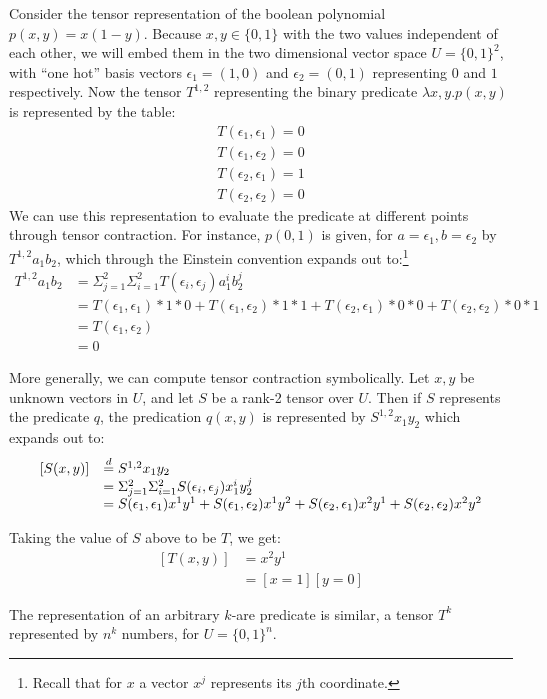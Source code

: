 \documentclass{article} %
\def\withmath#1{\relax\ifmmode#1\else{$ #1 $}\fi}
\def\defeq{\withmath{\stackrel{d}{=}}}
\begin{document}
\begin{example}\label{ex:tc-1}
  Consider the tensor representation of the boolean polynomial \(p(x,y) = x(1-y)\). Because \(x,y\in \{0,1\}\) with the two values independent of each other, we will embed them in the two dimensional vector space \(U=\{0,1\}^2\), with ``one hot'' basis vectors \(\epsilon_1=(1,0)\) and \(\epsilon_2=(0,1)\) representing \(0\) and \(1\) respectively. Now the tensor \(T^{1,2}\) representing the binary predicate \(\lambda x,y. p(x,y)\) is represented by the table:
  \[
  \begin{array}{l}
    T(\epsilon_1,\epsilon_1)=0\\
    T(\epsilon_1,\epsilon_2)=0\\
    T(\epsilon_2,\epsilon_1)=1\\
    T(\epsilon_2,\epsilon_2)=0
  \end{array}
  \]
  We can use this representation to evaluate the predicate at different points through tensor contraction. For instance, \(p(0,1)\) is given, for \(a=\epsilon_1,b=\epsilon_2\) by \(T^{1,2}a_1 b_2\), which through the Einstein convention expands out to:\footnote{Recall that for \(x\) a vector \(x^j\) represents its \(j\)th coordinate.}
  \[\begin{array}{ll}
  T^{1,2}a_1 b_2 &= \Sigma_{j=1}^2 \Sigma_{i=1}^2 T(\epsilon_i,\epsilon_j)a_1^ib_2^j \\
  &= T(\epsilon_1,\epsilon_1)*1*0 + T(\epsilon_1,\epsilon_2)*1*1 +
  T(\epsilon_2,\epsilon_1)*0*0 + T(\epsilon_2,\epsilon_2)*0*1 \\
  & =T(\epsilon_1,\epsilon_2)\\
  & = 0
  \end{array}
  \]
\end{example}

More generally, we can compute tensor contraction symbolically. Let \(x,y\) be  unknown vectors in \(U\), and let \(S\) be a rank-2 tensor over \(U\). Then if \(S\) represents the predicate \(q\), the predication \(q(x,y)\) is represented by \(S^{1,2}x_1 y_2\) which expands out to:
\[\begin{array}{ll}
  [S(x,y)]&\defeq  S^{1,2}x_1 y_2\\
  & = \Sigma_{j=1}^2 \Sigma_{i=1}^2 S(\epsilon_i,\epsilon_j)x_1^iy_2^j \\
  & =S(\epsilon_1,\epsilon_1)x^1y^1 + S(\epsilon_1,\epsilon_2)x^1y^2 +
      S(\epsilon_2,\epsilon_1)x^2y^1 + S(\epsilon_2,\epsilon_2)x^2y^2 \\
  \end{array}
  \]

  \begin{example}
    Taking the value of \(S\) above to be \(T\), we get:
    \[\begin{array}{ll}    
        [T(x,y)] & = x^2y^1\\
         & = [x=1][y=0]
    \end{array}
    \]
  \end{example}

The representation of an arbitrary $k$-are predicate is similar, a tensor \(T^k\) represented by \(n^k\) numbers, for \(U=\{0,1\}^n\). 
\end{document}
